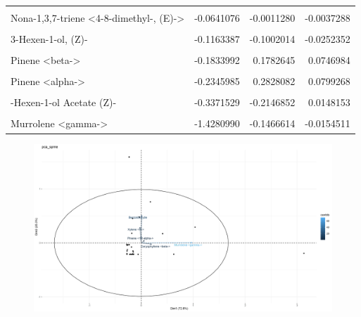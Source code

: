 \documentclass[12pt,final,CPage]{ufthesis}
\begin{document}
{\begin{table}
{\begin{tabular}[t]{lrrr}
  \cellcolor{gray!6}{2-Hexenal} & \cellcolor{gray!6}{-0.0621556} & \cellcolor{gray!6}{-0.0199513} & \cellcolor{gray!6}{0.0088029}\\
  Nona-1,3,7-triene <4-8-dimethyl-, (E)-> & -0.0641076 & -0.0011280 & -0.0037288\\
  \cellcolor{gray!6}{Cadinene <delta->} & \cellcolor{gray!6}{-0.0706630} & \cellcolor{gray!6}{-0.0334461} & \cellcolor{gray!6}{-0.0287334}\\
  3-Hexen-1-ol, (Z)- & -0.1163387 & -0.1002014 & -0.0252352\\
  \addlinespace
  \cellcolor{gray!6}{Germacrene D} & \cellcolor{gray!6}{-0.1453546} & \cellcolor{gray!6}{0.0133377} & \cellcolor{gray!6}{-0.0014412}\\
  Pinene <beta-> & -0.1833992 & 0.1782645 & 0.0746984\\
  \cellcolor{gray!6}{Ocimene, <beta->} & \cellcolor{gray!6}{-0.2287973} & \cellcolor{gray!6}{0.3568309} & \cellcolor{gray!6}{0.1167148}\\
  Pinene <alpha-> & -0.2345985 & 0.2828082 & 0.0799268\\
  \cellcolor{gray!6}{Farnesene <(E,E)-, alpha->} & \cellcolor{gray!6}{-0.2452920} & \cellcolor{gray!6}{0.0848936} & \cellcolor{gray!6}{0.0702475}\\
  \addlinespace
  3-Hexen-1-ol Acetate (Z)- & -0.3371529 & -0.2146852 & 0.0148153\\
  \cellcolor{gray!6}{Caryophyllene <beta->} & \cellcolor{gray!6}{-0.5626760} & \cellcolor{gray!6}{0.2589637} & \cellcolor{gray!6}{0.0807489}\\
  Murrolene <gamma-> & -1.4280990 & -0.1466614 & -0.0154511\\
  \bottomrule
  \end{tabular}}
  \end{table}
  \begin{figure}

  {\centering \includegraphics[width=1\linewidth]{figure/rrv_volatiles_biplot_var_pca_spme} 

}
\end{figure}}
\end{document}
